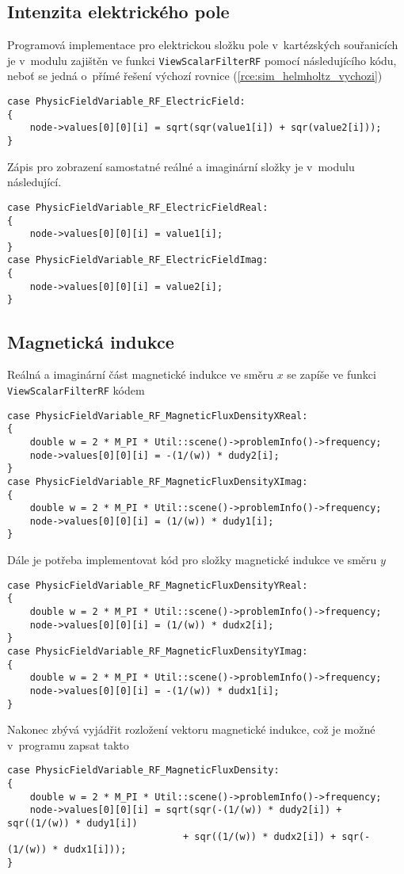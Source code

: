 \subsection*{Intenzita elektrického pole}
Programová implementace pro elektrickou složku pole v~kartézských souřanicích je v~modulu zajištěn ve funkci \texttt{ViewScalarFilterRF} pomocí následujícího kódu, neboť se jedná o~přímé řešení výchozí rovnice (\ref{rce:sim_helmholtz_vychozi})
\begin{verbatim}
case PhysicFieldVariable_RF_ElectricField:
{
    node->values[0][0][i] = sqrt(sqr(value1[i]) + sqr(value2[i]));
}    
\end{verbatim}
Zápis pro zobrazení samostatné reálné a imaginární složky je v~modulu následující.
\begin{verbatim}
case PhysicFieldVariable_RF_ElectricFieldReal:
{
    node->values[0][0][i] = value1[i];
}    
case PhysicFieldVariable_RF_ElectricFieldImag:
{    
    node->values[0][0][i] = value2[i];
}
\end{verbatim}

\subsection*{Magnetická indukce}
Reálná a imaginární část magnetické indukce ve směru $x$ se zapíše ve funkci \texttt{ViewScalarFilterRF} kódem
\begin{verbatim}
case PhysicFieldVariable_RF_MagneticFluxDensityXReal:
{
    double w = 2 * M_PI * Util::scene()->problemInfo()->frequency;
    node->values[0][0][i] = -(1/(w)) * dudy2[i];
}
case PhysicFieldVariable_RF_MagneticFluxDensityXImag:
{
    double w = 2 * M_PI * Util::scene()->problemInfo()->frequency;
    node->values[0][0][i] = (1/(w)) * dudy1[i];
}    
\end{verbatim}
Dále je potřeba implementovat kód pro složky magnetické indukce ve směru $y$
\begin{verbatim}
case PhysicFieldVariable_RF_MagneticFluxDensityYReal:
{
    double w = 2 * M_PI * Util::scene()->problemInfo()->frequency;
    node->values[0][0][i] = (1/(w)) * dudx2[i];
}
case PhysicFieldVariable_RF_MagneticFluxDensityYImag:
{
    double w = 2 * M_PI * Util::scene()->problemInfo()->frequency;
    node->values[0][0][i] = -(1/(w)) * dudx1[i];
}
\end{verbatim}
Nakonec zbývá vyjádřit rozložení vektoru magnetické indukce, což je možné v~programu zapsat takto
\begin{verbatim}
case PhysicFieldVariable_RF_MagneticFluxDensity:
{
    double w = 2 * M_PI * Util::scene()->problemInfo()->frequency;
    node->values[0][0][i] = sqrt(sqr(-(1/(w)) * dudy2[i]) + sqr((1/(w)) * dudy1[i])
                               + sqr((1/(w)) * dudx2[i]) + sqr(-(1/(w)) * dudx1[i]));
}
\end{verbatim}

